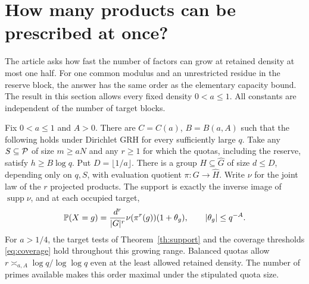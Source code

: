 \section{How many products can be prescribed at once?}\label{sec:growing}
The article asks how fast the number of factors can grow at retained density at most one half. For one common modulus and an unrestricted residue in the reserve block, the answer has the same order as the elementary capacity bound. The result in this section allows every fixed density \(0<a\le1\). All constants are independent of the number of target blocks.

\begin{theorem}\label{th:growing}
Fix \(0<a\le1\) and \(A>0\). There are \(C=C(a)\), \(B=B(a,A)\) such that the following holds under Dirichlet GRH for every sufficiently large \(q\). Take any \(S\subseteq\mathcal P\) of size \(m\ge aN\) and any \(r\ge1\) for which the quotas, including the reserve, satisfy \(h\ge B\log q\). Put \(D=\lfloor1/a\rfloor\). There is a group \(H\subseteq\widehat G\) of size \(d\le D\), depending only on \(q,S\), with evaluation quotient \(\pi:G\to\widehat H\). Write \(\nu\) for the joint law of the \(r\) projected products. The support is exactly the inverse image of \(\operatorname{supp}\nu\), and at each occupied target,
\[
  \mathbb P(X=g)=\frac{d^r}{|G|^r}\nu(\pi^r(g))(1+\theta_g),
       \qquad |\theta_g|\le q^{-A}.
\]
For \(a>1/4\), the target tests of Theorem~\ref{th:support} and the coverage thresholds \eqref{eq:coverage} hold throughout this growing range. Balanced quotas allow \(r\asymp_{a,A} \log q/\log\log q\) even at the least allowed retained density. The number of primes available makes this order maximal under the stipulated quota size.
\end{theorem}


